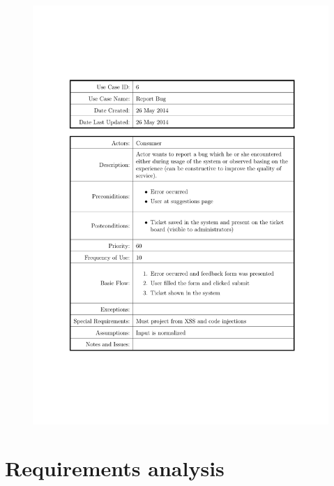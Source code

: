 \documentclass{tufte-book}
\begin{document}
\begin{figure}[h] \includegraphics[width=\linewidth]{Requirements/UseCases/006_ReportBug.pdf}\end{figure}


\chapter{Requirements analysis}
\end{document}
